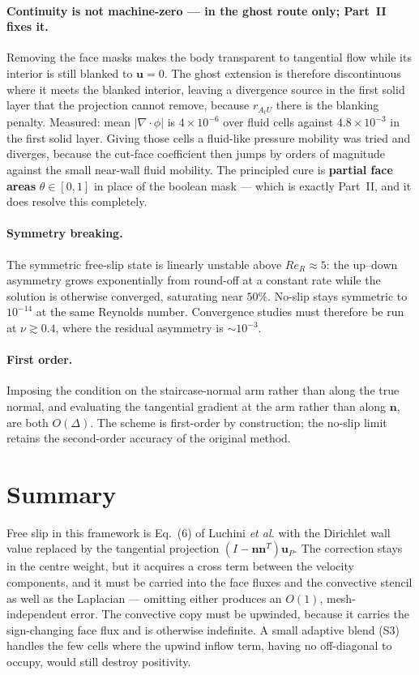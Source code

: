 \documentclass[11pt,a4paper]{article}
\newcommand{\uu}{\bm{u}}
\newcommand{\nn}{\bm{n}}
\newcommand{\rAtU}{r_{A_tU}}
\begin{document}
\paragraph{Continuity is not machine-zero --- in the ghost route only; Part~II fixes it.}
Removing the face masks makes the body transparent
to tangential flow while its interior is still blanked to $\uu=0$. The ghost extension is
therefore discontinuous where it meets the blanked interior, leaving a divergence source in
the first solid layer that the projection cannot remove, because $\rAtU$ there is the blanking
penalty. Measured: mean $|\nabla\!\cdot\!\phi|$ is $4\times10^{-6}$ over fluid cells against
$4.8\times10^{-3}$ in the first solid layer. Giving those cells a fluid-like pressure mobility
was tried and diverges, because the cut-face coefficient then jumps by orders of magnitude
against the small near-wall fluid mobility. The principled cure is \textbf{partial face areas}
$\theta\in[0,1]$ in place of the boolean mask --- which is exactly Part~II, and it does
resolve this completely.

\paragraph{Symmetry breaking.} The symmetric free-slip state is linearly unstable above
$Re_R\approx5$: the up--down asymmetry grows exponentially from round-off at a constant rate
while the solution is otherwise converged, saturating near $50\%$. No-slip stays symmetric to
$10^{-14}$ at the same Reynolds number. Convergence studies must therefore be run at
$\nu\gtrsim0.4$, where the residual asymmetry is $\sim10^{-3}$.

\paragraph{First order.} Imposing the condition on the staircase-normal arm rather than along
the true normal, and evaluating the tangential gradient at the arm rather than along $\nn$,
are both $O(\Delta)$. The scheme is first-order by construction; the no-slip limit retains the
second-order accuracy of the original method.

\section{Summary}

Free slip in this framework is Eq.~(6) of Luchini \emph{et al.} with the Dirichlet wall value
replaced by the tangential projection $(I-\nn\nn^{T})\uu_P$. The correction stays in the
centre weight, but it acquires a cross term between the velocity components, and it must be
carried into the face fluxes and the convective stencil as well as the Laplacian --- omitting
either produces an $O(1)$, mesh-independent error. The convective copy must be upwinded,
because it carries the sign-changing face flux and is otherwise indefinite. A small adaptive
blend (S3) handles the few cells where the upwind inflow term, having no off-diagonal to
occupy, would still destroy positivity.
\end{document}

